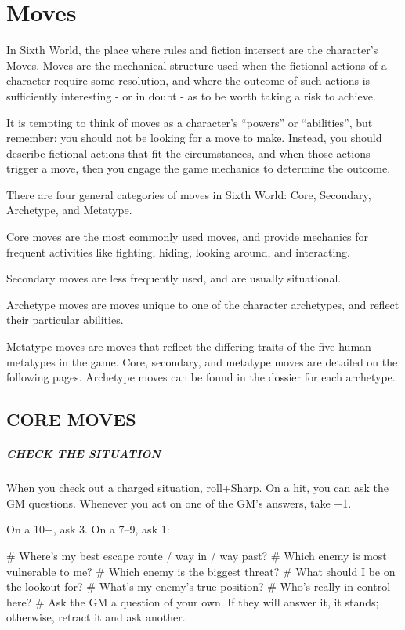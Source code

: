 \chapter{Moves} \label{moves}

In Sixth World, the place where rules and fiction intersect are the character’s Moves. Moves are the mechanical structure used when the fictional actions of a character require some resolution, and where the outcome of such actions is sufficiently interesting - or in doubt - as to be worth taking a risk to achieve.

It is tempting to think of moves as a character’s ``powers'' or ``abilities'', but remember: you should not be looking for a move to make. Instead, you should describe fictional actions that fit the circumstances, and when those actions trigger a move, then you engage the game mechanics to determine the outcome.

There are four general categories of moves in Sixth World: Core, Secondary, Archetype, and Metatype.

Core moves are the most commonly used moves, and provide mechanics for frequent activities like fighting, hiding, looking around, and interacting.

Secondary moves are less frequently used, and are usually situational.

Archetype moves are moves unique to one of the character archetypes, and reflect their particular abilities.

Metatype moves are moves that reflect the differing traits of the five human metatypes in the game. Core, secondary, and metatype moves are detailed on the following pages. Archetype moves can be found in the dossier for each archetype.

\section{CORE MOVES}

\paragraph{CHECK THE SITUATION}
When you check out a charged situation, roll+Sharp. On a hit, you can ask the GM questions. Whenever you act on one of the GM’s answers, take +1.

On a 10+, ask 3. On a 7–9, ask 1:

\begin{easylist}
    # Where’s my best escape route / way in / way past?
    # Which enemy is most vulnerable to me?
    # Which enemy is the biggest threat?
    # What should I be on the lookout for?
    # What’s my enemy’s true position?
    # Who’s really in control here?
    # Ask the GM a question of your own. If they will answer it, it stands; otherwise, retract it and ask another.
\end{easylist}



